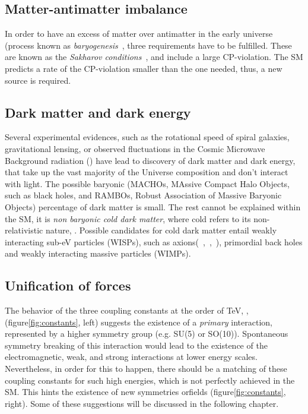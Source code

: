 \subsection{Matter-antimatter imbalance}
In order to have an excess of matter over antimatter in the early universe (process known as \textit{baryogenesis}~\cite{Baryogenesis}, three requirements have to be fulfilled. These are known as the \textit{Sakharov conditions}~\cite{Baryogenesis}, and include a large CP-violation. The SM predicts a rate of the CP-violation smaller than the one needed, thus, a new source is required.
\subsection{Dark matter and dark energy}
\label{subsec:DarkMatter_DarkEnergy}
Several experimental evidences, such as the rotational speed of spiral galaxies, gravitational lensing, or observed fluctuations in the Cosmic Microwave Background radiation () have lead to  discovery of dark matter and dark energy, that take up the vast majority of the Universe composition {and don't interact with light}. The possible baryonic (MACHOs, MAssive Compact Halo Objects, such as black holes, and RAMBOs, Robust Association of Massive Baryonic Objects) percentage of dark matter is small. The rest cannot be explained within the SM, it is \textit{non baryonic cold dark matter}, where cold refers to its non-relativistic nature, . Possible candidates for cold dark matter entail weakly interacting sub-eV particles (WISPs), such as axions(~\cite{Axions1},~\cite{Axions2},~\cite{Axions3}), primordial back holes  and weakly interacting massive particles (WIMPs). 

\subsection{Unification of forces}
The behavior of the three coupling constants at the order of TeV,
,(figure\ref{fig:constants}, left) suggests the existence of a \textit{primary} interaction, represented by a higher symmetry group (e.g. SU(5) or SO(10)). Spontaneous symmetry breaking of this interaction would lead to the existence of the electromagnetic, weak, and strong interactions at lower energy scales. Nevertheless, in order for this to happen, there should be a matching of these coupling constants for such high energies, which is not perfectly achieved in the SM. This hints the existence of new symmetries orfields (figure\ref{fig:constants}, right). Some of these suggestions will be discussed in the following chapter. 

